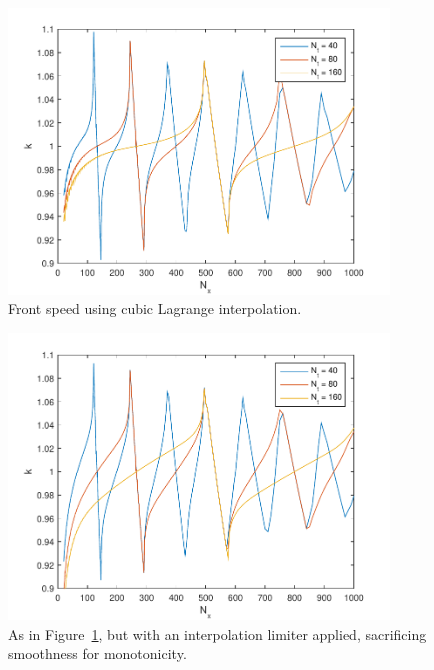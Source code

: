 \documentclass{article}
\begin{document}
\begin{figure}[htbp]
\centering
  \includegraphics[width=0.9\textwidth]{alan6-k.pdf}
  \caption{Front speed using cubic Lagrange interpolation.
  \label{fig:alan6-k}}
\end{figure}
\begin{figure}[hbtp]
\centering
  \includegraphics[width=0.9\textwidth]{alan5-k.pdf}
  \caption{As in Figure~\ref{fig:alan6-k}, but with an interpolation limiter
  applied, sacrificing smoothness for monotonicity.
  \label{fig:alan5-k}}
\end{figure}
\end{document}
